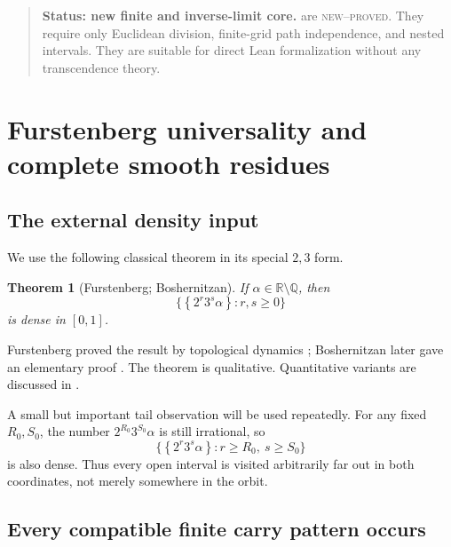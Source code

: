 \documentclass[11pt]{article}
\newtheorem{theorem}{Theorem}[section]
\theoremstyle{definition}
\theoremstyle{remark}
\newcommand{\Q}{\mathbb Q}
\newcommand{\R}{\mathbb R}
\newcommand{\fract}[1]{\left\{#1\right\}}
\newcommand{\statusproved}{\textcolor{deepgreen}{\textsc{new--proved}}}
\newenvironment{statusbox}[1]
{\begin{quote}\small\noindent\textbf{Status: #1.}\quad}
{\end{quote}}
\begin{document}
\begin{statusbox}{new finite and inverse-limit core}
are \statusproved.  They require only Euclidean division, finite-grid path
independence, and nested intervals.  They are suitable for direct Lean
formalization without any transcendence theory.
\end{statusbox}

\section{Furstenberg universality and complete smooth residues}
\label{sec:furstenberg-universality}

\subsection{The external density input}

We use the following classical theorem in its special $2,3$ form.

\begin{theorem}[Furstenberg; Boshernitzan]\label{thm:furstenberg}
If $\alpha\in\R\setminus\Q$, then
\begin{equation}\label{eq:furstenberg-density}
 \bigl\{\fract{2^r3^s\alpha}:r,s\ge0\bigr\}
\end{equation}
is dense in $[0,1]$.
\end{theorem}

Furstenberg proved the result by topological dynamics
\cite{Furstenberg1967}; Boshernitzan later gave an elementary proof
\cite{Boshernitzan1994}.  The theorem is qualitative.  Quantitative variants are
discussed in .

A small but important tail observation will be used repeatedly.  For any fixed
$R_0,S_0$, the number $2^{R_0}3^{S_0}\alpha$ is still irrational, so
\begin{equation}\label{eq:tail-density}
 \bigl\{\fract{2^r3^s\alpha}:r\ge R_0,\ s\ge S_0\bigr\}
\end{equation}
is also dense.  Thus every open interval is visited arbitrarily far out in both
coordinates, not merely somewhere in the orbit.

\subsection{Every compatible finite carry pattern occurs}
\end{document}

